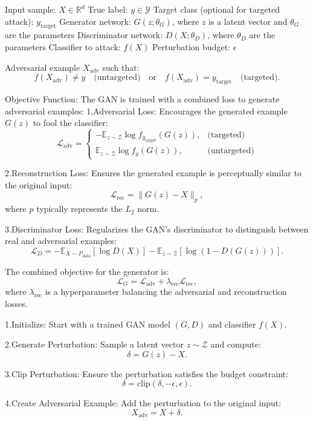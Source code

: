 Input sample: $X \in \mathbb{R}^d$
True label: $y \in \mathcal{Y}$
Target class (optional for targeted attack): $y_{\text{target}}$
Generator network: $G(z; \theta_G)$, where $z$ is a latent vector and $\theta_G$ are the parameters
Discriminator network: $D(X; \theta_D)$, where $\theta_D$ are the parameters
Classifier to attack: $f(X)$
Perturbation budget: $\epsilon$

Adversarial example $X_{\text{adv}}$ such that:
\[
f(X_{\text{adv}}) \neq y \quad \text{(untargeted)} \quad \text{or} \quad f(X_{\text{adv}}) = y_{\text{target}} \quad \text{(targeted)}.
\]

Objective Function:
The GAN is trained with a combined loss to generate adversarial examples:
1.Adversarial Loss:
   Encourages the generated example $G(z)$ to fool the classifier:
   \[
   \mathcal{L}_{\text{adv}} = \begin{cases} 
   -\mathbb{E}_{z \sim \mathcal{Z}} \log f_{y_{\text{target}}}(G(z)), & \text{(targeted)} \\
   \mathbb{E}_{z \sim \mathcal{Z}} \log f_y(G(z)), & \text{(untargeted)}
   \end{cases}
   \]

2.Reconstruction Loss:
   Ensures the generated example is perceptually similar to the original input:
   \[
   \mathcal{L}_{\text{rec}} = \|G(z) - X\|_p,
   \]
   where $p$ typically represents the $L_2$ norm.

3.Discriminator Loss:
   Regularizes the GAN's discriminator to distinguish between real and adversarial examples:
   \[
   \mathcal{L}_D = -\mathbb{E}_{X \sim P_{\text{data}}}[\log D(X)] - \mathbb{E}_{z \sim \mathcal{Z}}[\log (1 - D(G(z)))].
   \]

The combined objective for the generator is:
\[
\mathcal{L}_G = \mathcal{L}_{\text{adv}} + \lambda_{\text{rec}} \mathcal{L}_{\text{rec}},
\]
where $\lambda_{\text{rec}}$ is a hyperparameter balancing the adversarial and reconstruction losses.

1.Initialize:
   Start with a trained GAN model $(G, D)$ and classifier $f(X)$.
   
2.Generate Perturbation:
   Sample a latent vector $z \sim \mathcal{Z}$ and compute:
   \[
   \delta = G(z) - X.
   \]

3.Clip Perturbation:
   Ensure the perturbation satisfies the budget constraint:
   \[
   \delta = \text{clip}(\delta, -\epsilon, \epsilon).
   \]

4.Create Adversarial Example:
   Add the perturbation to the original input:
   \[
   X_{\text{adv}} = X + \delta.
   \]

